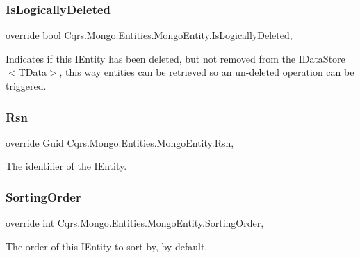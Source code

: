 \subsubsection{\texorpdfstring{Is\+Logically\+Deleted}{IsLogicallyDeleted}}
{\footnotesize\ttfamily override bool Cqrs.\+Mongo.\+Entities.\+Mongo\+Entity.\+Is\+Logically\+Deleted\hspace{0.3cm}{\ttfamily [get]}, {\ttfamily [set]}}



Indicates if this I\+Entity has been deleted, but not removed from the I\+Data\+Store$<$\+T\+Data$>$, this way entities can be retrieved so an un-\/deleted operation can be triggered. 

\mbox{\label{classCqrs_1_1Mongo_1_1Entities_1_1MongoEntity_a445634030176c4991c0de152981c19ce_a445634030176c4991c0de152981c19ce}} 
\subsubsection{\texorpdfstring{Rsn}{Rsn}}
{\footnotesize\ttfamily override Guid Cqrs.\+Mongo.\+Entities.\+Mongo\+Entity.\+Rsn\hspace{0.3cm}{\ttfamily [get]}, {\ttfamily [set]}}



The identifier of the I\+Entity. 

\mbox{\label{classCqrs_1_1Mongo_1_1Entities_1_1MongoEntity_a2f22c031f0aaa7b1b5eb6798d43d1ed2_a2f22c031f0aaa7b1b5eb6798d43d1ed2}} 
\subsubsection{\texorpdfstring{Sorting\+Order}{SortingOrder}}
{\footnotesize\ttfamily override int Cqrs.\+Mongo.\+Entities.\+Mongo\+Entity.\+Sorting\+Order\hspace{0.3cm}{\ttfamily [get]}, {\ttfamily [set]}}



The order of this I\+Entity to sort by, by default. 

